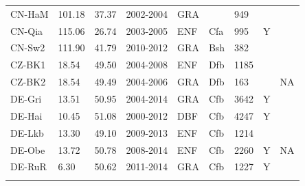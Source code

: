 \documentclass[gmd, manuscript]{copernicus}
\begin{document}
\begin{table}[t]
\begin{tabular}{lllllllll}
  CN-HaM & 101.18 & 37.37 & 2002-2004 & GRA &  & 949 &  & \citet{CN-HaM} \\ 
  CN-Qia & 115.06 & 26.74 & 2003-2005 & ENF & Cfa & 995 & Y & \citet{CN-Qia} \\ 
  CN-Sw2 & 111.90 & 41.79 & 2010-2012 & GRA & Bsh & 382 &  & \citet{CN-Sw2} \\ 
  CZ-BK1 & 18.54 & 49.50 & 2004-2008 & ENF & Dfb & 1185 &  & \citet{CZ-BK1} \\ 
  CZ-BK2 & 18.54 & 49.49 & 2004-2006 & GRA & Dfb & 163 &  & NA  \\ 
  DE-Gri & 13.51 & 50.95 & 2004-2014 & GRA & Cfb & 3642 & Y & \citet{DE-Gri} \\ 
  DE-Hai & 10.45 & 51.08 & 2000-2012 & DBF & Cfb & 4247 & Y & \citet{DE-Hai} \\ 
  DE-Lkb & 13.30 & 49.10 & 2009-2013 & ENF & Cfb & 1214 &  & \citet{DE-Lkb} \\ 
  DE-Obe & 13.72 & 50.78 & 2008-2014 & ENF & Cfb & 2260 & Y & NA \\ 
  DE-RuR & 6.30 & 50.62 & 2011-2014 & GRA & Cfb & 1227 & Y & \citet{DE-RuR} \\ 

    \bottomhline
\end{tabular}
\label{tab:sites1}
\end{table}
\clearpage
\end{document}
